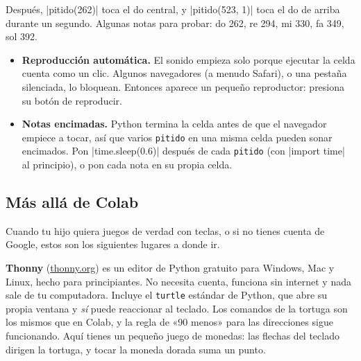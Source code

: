 Después, \py|pitido(262)| toca el do central, y \py|pitido(523, 1)| toca el do de arriba durante un segundo. Algunas notas para probar: do 262, re 294, mi 330, fa 349, sol 392.

\begin{itemize}
  \item \textbf{Reproducción automática.} El sonido empieza solo porque ejecutar la celda cuenta como un clic. Algunos navegadores (a menudo Safari), o una pestaña silenciada, lo bloquean. Entonces aparece un pequeño reproductor: presiona su botón de reproducir.
  \item \textbf{Notas encimadas.} Python termina la celda antes de que el navegador empiece a tocar, así que varios \texttt{pitido} en una misma celda pueden sonar encimados. Pon \py|time.sleep(0.6)| después de cada \texttt{pitido} (con \py|import time| al principio), o pon cada nota en su propia celda.
\end{itemize}

\subsection*{Más allá de Colab}

Cuando tu hijo quiera juegos de verdad con teclas, o si no tienes cuenta de Google, estos son los siguientes lugares a donde ir.

\textbf{Thonny} (\url{thonny.org}) es un editor de Python gratuito para Windows, Mac y Linux, hecho para principiantes. No necesita cuenta, funciona sin internet y nada sale de tu computadora. Incluye el \texttt{turtle} estándar de Python, que abre su propia ventana y \emph{sí} puede reaccionar al teclado. Los comandos de la tortuga son los mismos que en Colab, y la regla de «90 menos» para las direcciones sigue funcionando. Aquí tienes un pequeño juego de monedas: las flechas del teclado dirigen la tortuga, y tocar la moneda dorada suma un punto.

